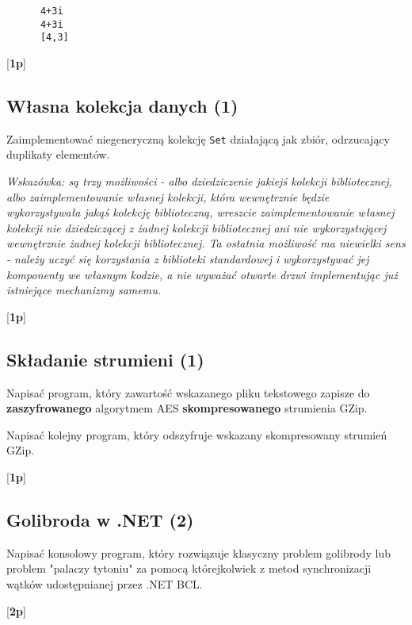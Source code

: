       \begin{verbatim}
      4+3i
      4+3i
      [4,3]
      \end{verbatim}

      [{\bf 1p}]  
                
\subsection{Własna kolekcja danych (1)}
      
      Zaimplementować niegeneryczną kolekcję {\tt Set} działającą jak zbiór, odrzucający duplikaty elementów.
\label{wlasne_kolekcje}	  
      
      {\em Wskazówka: są trzy możliwości - albo dziedziczenie jakiejś kolekcji bibliotecznej, albo zaimplementowanie własnej kolekcji, która wewnętrznie będzie wykorzystywała
      jakąś kolekcję biblioteczną, wreszcie zaimplementowanie własnej kolekcji nie dziedziczącej z żadnej kolekcji bibliotecznej ani nie wykorzystującej wewnętrznie żadnej
      kolekcji bibliotecznej. Ta ostatnia możliwość ma niewielki sens - należy uczyć się korzystania z biblioteki standardowej i wykorzystywać jej komponenty we własnym kodzie,
      a nie wyważać otwarte drzwi implementując już istniejące mechanizmy samemu.}

      [{\bf 1p}]  

\subsection{Składanie strumieni (1)}

      Napisać program, który zawartość wskazanego pliku tekstowego zapisze do {\bf zaszyfrowanego} algorytmem AES {\bf skompresowanego} 
\label{skladanie_strumieni}	  
	  strumienia GZip.
      
      Napisać kolejny program, który odszyfruje wskazany skompresowany strumień GZip.
            
      [{\bf 1p}]

\subsection{Golibroda w .NET (2)}

      Napisać konsolowy program, który rozwiązuje klasyczny problem golibrody lub problem "palaczy tytoniu" 
\label{golibroda_net}	  
      za pomocą którejkolwiek z metod synchronizacji wątków udostępnianej przez .NET BCL.  

      [{\bf 2p}] 
      
